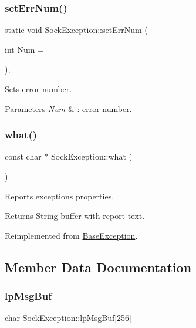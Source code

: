 \subsubsection{\texorpdfstring{set\+Err\+Num()}{setErrNum()}}
{\footnotesize\ttfamily static void Sock\+Exception\+::set\+Err\+Num (\begin{DoxyParamCaption}\item[{int}]{Num = {} }\end{DoxyParamCaption})\hspace{0.3cm}{\ttfamily [inline]}, {\ttfamily [static]}}

Sets error number. 
\begin{DoxyParams}{Parameters}
{\em Num} & \+: error number. \\
\hline
\end{DoxyParams}
\mbox{\label{classSockException_afb2986f2ddefe08ae1e735796cd05b1a}} 
\subsubsection{\texorpdfstring{what()}{what()}}
{\footnotesize\ttfamily const char $\ast$ Sock\+Exception\+::what (\begin{DoxyParamCaption}{ }\end{DoxyParamCaption})\hspace{0.3cm}{\ttfamily [virtual]}}

Reports exception\textquotesingle{}s properties. \begin{DoxyReturn}{Returns}
String buffer with report text. 
\end{DoxyReturn}


Reimplemented from \hyperlink{group__EXCEPT__GROUP_gaf092dd6587491cd7a8cdd987597b1018}{Base\+Exception}.



\subsection{Member Data Documentation}
\mbox{\label{classSockException_a20f0f8c9f9c66905bba850c5ee508797}} 
\subsubsection{\texorpdfstring{lp\+Msg\+Buf}{lpMsgBuf}}
{\footnotesize\ttfamily char Sock\+Exception\+::lp\+Msg\+Buf\mbox{[}256\mbox{]}\hspace{0.3cm}{\ttfamily [protected]}}




